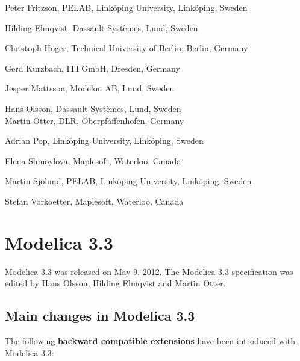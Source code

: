 \documentclass[10pt,a4paper]{report}
\def\doublelabel#1{\label{#1}\hypertarget{#1}{}}
\begin{document}
Peter Fritzson, PELAB, Linköping University, Linköping, Sweden

Hilding Elmqvist, Dassault Systèmes, Lund, Sweden

Christoph Höger, Technical University of Berlin, Berlin, Germany

Gerd Kurzbach, ITI GmbH, Dresden, Germany

Jesper Mattsson, Modelon AB, Lund, Sweden

Hans Olsson, Dassault Systèmes, Lund, Sweden\\
Martin Otter, DLR, Oberpfaffenhofen, Germany

Adrian Pop, Linköping University, Linköping, Sweden

Elena Shmoylova, Maplesoft, Waterloo, Canada

Martin Sjölund, PELAB, Linköping University, Linköping, Sweden

Stefan Vorkoetter, Maplesoft, Waterloo, Canada

\section{Modelica 3.3}\doublelabel{modelica-3-3}

Modelica 3.3 was released on May 9, 2012. The Modelica 3.3 specification
was edited by Hans Olsson, Hilding Elmqvist and Martin Otter.

\subsection{Main changes in Modelica 3.3}\doublelabel{main-changes-in-modelica-3-3}

The following \textbf{backward compatible extensions} have been
introduced with Modelica 3.3:
\end{document}
